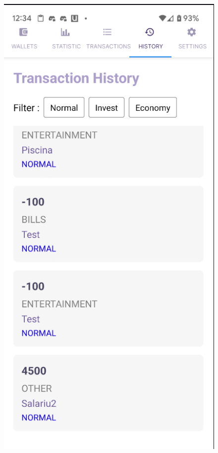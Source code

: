 \begin{figure}[htbp]
    \centering
    \begin{minipage}[t]{0.2\textwidth}
        \centering
        \includegraphics[width=\textwidth]{Screen Shots/Moneager/TranasactionHistoryScreen.png}

\end{minipage}
\end{figure}
